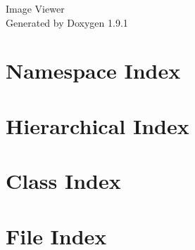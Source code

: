 \let\mypdfximage\pdfximage\def\pdfximage{\immediate\mypdfximage}\documentclass[twoside]{book}
\newcommand{\+}{\discretionary{\mbox{\scriptsize$\hookleftarrow$}}{}{}}
\newcommand{\clearemptydoublepage}{%
  \newpage{\pagestyle{empty}\cleardoublepage}%
}
\begin{document}
\raggedbottom

\hypersetup{pageanchor=false,
             bookmarksnumbered=true,
             pdfencoding=unicode
            }
\begin{titlepage}
\vspace*{7cm}
\begin{center}%
{\Large Image Viewer }\\
\vspace*{1cm}
{\large Generated by Doxygen 1.9.1}\\
\end{center}
\end{titlepage}
\clearemptydoublepage
{}
\tableofcontents
\clearemptydoublepage
{}
\hypersetup{pageanchor=true}

\chapter{Namespace Index}

\chapter{Hierarchical Index}

\chapter{Class Index}

\chapter{File Index}

\end{document}

